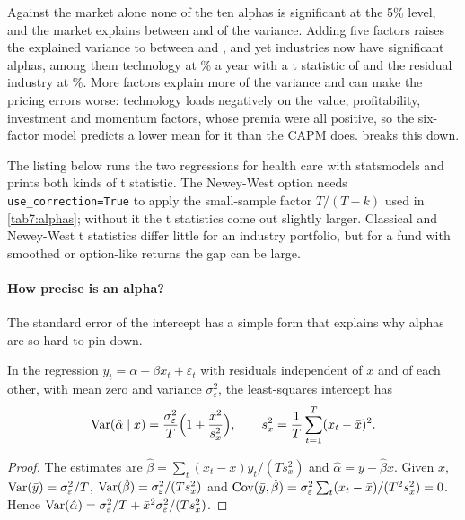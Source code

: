 \begin{chapterrefs}
Against the market alone none of the ten alphas is significant at the 5\% level, and the market
explains between \alRsqMinCapm{} and \alRsqMaxCapm{} of the variance. Adding five factors raises the
explained variance to between \alRsqMinSix{} and \alRsqMaxSix, and yet \alNsigSixWord{} industries now
have significant alphas, among them technology at \alHiTecA\% a year with a t statistic of
\alHiTecT{} and the residual industry at \alOtherA\%. More factors explain more of the variance and
can make the pricing errors worse: technology loads negatively on the value, profitability,
investment and momentum factors, whose premia were all positive, so the six-factor model predicts a lower mean for it
than the CAPM does.  breaks this down.

The listing below runs the two regressions for health care with statsmodels and prints both kinds of
t statistic. The Newey-West option needs \texttt{use\_correction=True} to apply the small-sample
factor $T/(T-k)$ used in \cref{tab7:alphas}; without it the t statistics come out slightly larger.
Classical and Newey-West t statistics differ little for an industry portfolio, but for a fund
with smoothed or option-like returns the gap can be large.


\paragraph{How precise is an alpha?}
The standard error of the intercept has a simple form that explains why alphas are so hard to pin
down.

\begin{proposition}\label{prop7:alphase}
In the regression $y_t=\alpha+\beta x_t+\varepsilon_t$ with residuals independent of $x$ and of each
other, with mean zero and variance $\sigma_\varepsilon^2$, the least-squares intercept has
\begin{equation}\label{eq7:alphase}
  \operatorname{Var}(\hat\alpha\mid x)=\frac{\sigma_\varepsilon^2}{T}\Bigl(1+\frac{\bar x^2}{s_x^2}\Bigr),
  \qquad s_x^2=\frac1T\sum_{t=1}^T(x_t-\bar x)^2 .
\end{equation}
\end{proposition}

\begin{proof}
The estimates are $\hat\beta=\sum_t(x_t-\bar x)y_t/(Ts_x^2)$ and $\hat\alpha=\bar y-\hat\beta\bar x$.
Given $x$, $\operatorname{Var}(\bar y)=\sigma_\varepsilon^2/T$, $\operatorname{Var}(\hat\beta)=\sigma_\varepsilon^2/(Ts_x^2)$ and
$\operatorname{Cov}(\bar y,\hat\beta)=\sigma_\varepsilon^2\sum_t(x_t-\bar x)/(T^2s_x^2)=0$. Hence
$\operatorname{Var}(\hat\alpha)=\sigma_\varepsilon^2/T+\bar x^2\sigma_\varepsilon^2/(Ts_x^2)$.
\end{proof}


\end{chapterrefs}
